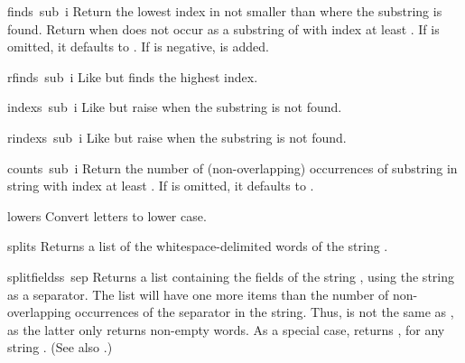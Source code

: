 \begin{funcdesc}{find}{s\, sub\, i}
Return the lowest index in  not smaller than  where the
substring  is found.  Return  when 
does not occur as a substring of  with index at least .
If  is omitted, it defaults to .  If  is
negative,  is added.
\end{funcdesc}

\begin{funcdesc}{rfind}{s\, sub\, i}
Like  but finds the highest index.
\end{funcdesc}

\begin{funcdesc}{index}{s\, sub\, i}
Like  but raise  when the substring is
not found.
\end{funcdesc}

\begin{funcdesc}{rindex}{s\, sub\, i}
Like  but raise  when the substring is
not found.
\end{funcdesc}

\begin{funcdesc}{count}{s\, sub\, i}
Return the number of (non-overlapping) occurrences of substring
 in string  with index at least .
If  is omitted, it defaults to .
\end{funcdesc}

\begin{funcdesc}{lower}{s}
Convert letters to lower case.
\end{funcdesc}

\begin{funcdesc}{split}{s}
Returns a list of the whitespace-delimited words of the string
.
\end{funcdesc}

\begin{funcdesc}{splitfields}{s\, sep}
  Returns a list containing the fields of the string , using
  the string  as a separator.  The list will have one more
  items than the number of non-overlapping occurrences of the
  separator in the string.  Thus,  is not the same as , as the latter
  only returns non-empty words.  As a special case,
   returns \code{[\var{s}]}, for any string
  .  (See also .)
\end{funcdesc}

